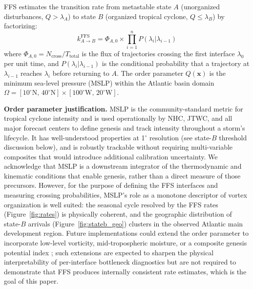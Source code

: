 \documentclass[11pt]{article}
\begin{document}
FFS estimates the transition rate from metastable state $A$ (unorganized
disturbances, $Q > \lambda_A$) to state $B$ (organized tropical cyclone,
$Q \leq \lambda_B$) by factorizing:
\begin{equation}
k_{A\to B}^{\text{FFS}} = \Phi_{A,0} \times \prod_{i=1}^{n} P(\lambda_i | \lambda_{i-1})
\label{eq:ffs_rate}
\end{equation}
where $\Phi_{A,0} = N_{\text{cross}}/T_{\text{total}}$ is the flux of trajectories
crossing the first interface $\lambda_0$ per unit time, and $P(\lambda_i|\lambda_{i-1})$
is the conditional probability that a trajectory at $\lambda_{i-1}$ reaches $\lambda_i$
before returning to $A$. The order parameter $Q(\mathbf{x})$ is the minimum
sea-level pressure (MSLP) within the Atlantic basin domain
$\Omega = [10^\circ\text{N},\,40^\circ\text{N}] \times [100^\circ\text{W},\,20^\circ\text{W}]$.

\textbf{Order parameter justification.}
MSLP is the community-standard metric for tropical cyclone intensity and is used
operationally by NHC, JTWC, and all major forecast centers to define genesis and
track intensity throughout a storm's lifecycle.
It has well-understood properties at 1$^\circ$ resolution (see state-$B$ threshold
discussion below), and is robustly trackable without requiring multi-variable composites
that would introduce additional calibration uncertainty.
We acknowledge that MSLP is a downstream integrator of the thermodynamic and kinematic
conditions that enable genesis, rather than a direct measure of those precursors.
However, for the purpose of defining the FFS interfaces and measuring crossing probabilities,
MSLP's role as a monotone descriptor of vortex organization is well suited: the seasonal
cycle resolved by the FFS rates (Figure~\ref{fig:rates}) is physically coherent, and the
geographic distribution of state-$B$ arrivals (Figure~\ref{fig:stateb_geo}) clusters in
the observed Atlantic main development region.
Future implementations could extend the order parameter to incorporate low-level vorticity,
mid-tropospheric moisture, or a composite genesis potential index
\citep[e.g.,][]{bister1998dissipative,camargo2007use};
such extensions are expected to sharpen the physical interpretability of
per-interface bottleneck diagnostics but are not required to demonstrate that FFS
produces internally consistent rate estimates, which is the goal of this paper.
\end{document}
